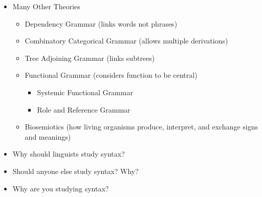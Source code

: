 \documentclass[a4paper,landscape,headrule,footrule]{foils}
\begin{document}
  \begin{tree}\tiny
    { {
        {}}}
     
  \end{tree}
\vspace*{-2em}
  \begin{small}
    \begin{itemize}
    \item Many Other Theories
      \begin{itemize}
      \item Dependency Grammar  (links words not phrases)
      \item Combinatory Categorical Grammar (allows multiple derivations)
      \item Tree Adjoining Grammar (links subtrees)
      \item Functional Grammar (considers function to be central)
        \begin{itemize}
        \item Systemic Functional Grammar
        \item Role and Reference Grammar
        \end{itemize}
      \item Biosemiotics (how living organisms produce, interpret, and exchange signs and meanings)
      \end{itemize}
    \end{itemize}
  \end{small}



\begin{itemize}
\item Why should linguists study syntax?

\item Should anyone else study syntax? Why?
\item Why are you studying syntax?
\end{itemize}
\end{document}
